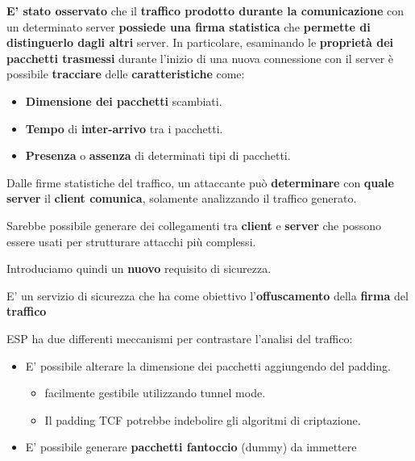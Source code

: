\begin{remark}
\textbf{E' stato osservato} che il \textbf{traffico prodotto durante la comunicazione} con un determinato server \textbf{possiede una firma statistica} che \textbf{permette di distinguerlo dagli altri} server. In particolare, esaminando le \textbf{proprietà dei pacchetti trasmessi} durante l’inizio di una nuova connessione con il server è possibile \textbf{tracciare} delle \textbf{caratteristiche} come:
\begin{itemize}
    \item \textbf{Dimensione dei pacchetti} scambiati.
    \item \textbf{Tempo} di  \textbf{inter-arrivo} tra i pacchetti.
    \item \textbf{Presenza} o \textbf{assenza} di determinati tipi di pacchetti.
\end{itemize}
\end{remark}
Dalle firme statistiche del traffico, un attaccante può \textbf{determinare} con \textbf{quale server} il \textbf{client comunica}, solamente analizzando il traffico generato. \\
\begin{remark}
Sarebbe possibile generare dei collegamenti tra \textbf{client} e \textbf{server} che possono essere usati per strutturare attacchi più complessi.
\end{remark}
Introduciamo quindi un \textbf{nuovo} requisito di sicurezza.
\begin{definition}\label{def:trafflow}
E' un servizio di sicurezza che ha come obiettivo l'\textbf{offuscamento} della \textbf{firma} del \textbf{traffico}
\end{definition} 
ESP ha due differenti meccanismi per contrastare l'analisi del traffico:
\begin{proposition}
\begin{itemize}
    \item E' possibile alterare la dimensione dei pacchetti aggiungendo del padding. 
    \begin{itemize}
        \item [\textcolor{green}{\checkmark}] facilmente gestibile utilizzando tunnel mode.
        \item [\textcolor{red}{\ding{55}}] Il padding TCF potrebbe indebolire gli algoritmi di criptazione.
    \end{itemize}
    \item E' possibile generare \textbf{pacchetti fantoccio} (dummy) da immettere 
\end{itemize}
\end{proposition}
